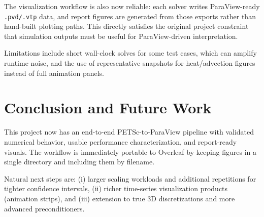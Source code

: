 \documentclass[11pt]{article}
\begin{document}
The visualization workflow is also now reliable: each solver writes ParaView-ready
\texttt{.pvd/.vtp} data, and report figures are generated from those exports rather
than hand-built plotting paths. This directly satisfies the original project
constraint that simulation outputs must be useful for ParaView-driven interpretation.

Limitations include short wall-clock solves for some test cases, which can amplify
runtime noise, and the use of representative snapshots for heat/advection figures
instead of full animation panels.

\section{Conclusion and Future Work}
This project now has an end-to-end PETSc-to-ParaView pipeline with validated
numerical behavior, usable performance characterization, and report-ready visuals.
The workflow is immediately portable to Overleaf by keeping figures in a single
directory and including them by filename.

Natural next steps are: (i) larger scaling workloads and additional repetitions
for tighter confidence intervals, (ii) richer time-series visualization products
(animation strips), and (iii) extension to true 3D discretizations and more
advanced preconditioners.
\end{document}
